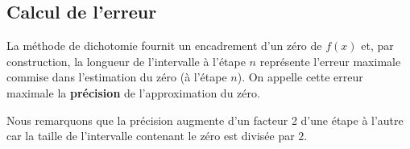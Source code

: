 \documentclass[11pt,a4paper,twoside,greek]{report}
\begin{document}
%
%
%
%



\subsection{Calcul de l'erreur}

La méthode de dichotomie fournit un encadrement d'un zéro de $f(x)$ et, par construction, la longueur de l'intervalle à l'étape $n$ représente l'erreur maximale commise dans l'estimation du zéro (à l'étape $n$). On appelle cette erreur maximale  la \textbf{précision} de l'approximation du zéro.

\smallskip
Nous remarquons que la précision augmente d'un facteur 2 d'une étape à l'autre car la taille de l'intervalle contenant le zéro est divisée par $2$.

\end{document}

